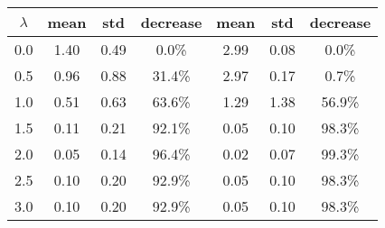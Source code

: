 \begin{tabular}{c||c|c|c||c|c|c}
\toprule
 $\lambda$ &  mean &  std & decrease &  mean &  std & decrease \\
\midrule
       0.0 &  1.40 & 0.49 &    0.0\% &  2.99 & 0.08 &    0.0\% \\
       0.5 &  0.96 & 0.88 &   31.4\% &  2.97 & 0.17 &    0.7\% \\
       1.0 &  0.51 & 0.63 &   63.6\% &  1.29 & 1.38 &   56.9\% \\
       1.5 &  0.11 & 0.21 &   92.1\% &  0.05 & 0.10 &   98.3\% \\
       2.0 &  0.05 & 0.14 &   96.4\% &  0.02 & 0.07 &   99.3\% \\
       2.5 &  0.10 & 0.20 &   92.9\% &  0.05 & 0.10 &   98.3\% \\
       3.0 &  0.10 & 0.20 &   92.9\% &  0.05 & 0.10 &   98.3\% \\
\bottomrule
\end{tabular}

